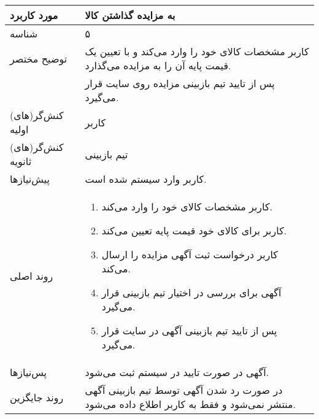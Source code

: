 \documentclass{article}
\begin{document}
\begin{center}
\begin{tabular} {|p{}|p{}|}
\hline
 مورد کاربرد & 
 به مزایده گذاشتن کالا
\\ \hline
 شناسه &
۵
\\ \hline
توضیح مختصر &
کاربر مشخصات کالای خود را وارد می‌کند و با تعیین یک قیمت پایه آن را به مزایده می‌گذارد.
\\
&
پس از تایید تیم بازبینی مزایده روی سایت قرار می‌گیرد.
\\ \hline
کنش‌گر(های) اولیه &
کاربر
\\ \hline
کنش‌گر(های) ثانویه &
تیم بازبینی
\\ \hline
پیش‌نیازها &
کاربر وارد سیستم شده است.
\\ \hline
روند اصلی &
\begin{enumerate}
\item
کاربر مشخصات کالای خود را وارد می‌کند.
\item
کاربر برای کالای خود قیمت پایه تعیین می‌کند.
\item
کاربر درخواست ثبت آگهی مزایده را ارسال می‌کند.
\item
آگهی برای بررسی در اختیار تیم بازبینی قرار می‌گیرد.
\item
پس از تایید تیم بازبینی آگهی در سایت قرار می‌گیرد.
\end{enumerate}
\\ \hline
پس‌نیازها &
آگهی در صورت تایید در سیستم ثبت می‌شود.
\\ \hline
روند جایگزین &
در صورت رد شدن آگهی توسط تیم بازبینی آگهی منتشر نمی‌شود و فقط به کاربر اطلاع داده می‌شود. 
\\ \hline
\end{tabular}
\end{center}

\newpage
\end{document}
